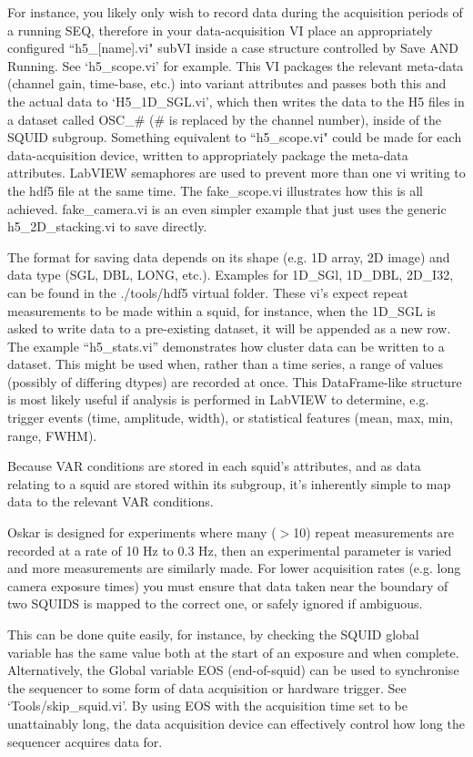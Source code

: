 \documentclass[10pt,a4paper]{article}
\newenvironment{warning}[1]{%
	\tcolorbox[beamer,%
	breakable,
	colback=white,colframe=DarkRed,%
	title=Warning:]}%
{\endtcolorbox}
\begin{document}
For instance, you likely only wish to record data during the acquisition periods of a running SEQ, therefore in your data-acquisition VI place an appropriately configured ``h5\_[name].vi" subVI inside a case structure controlled by Save AND Running.  See `h5\_scope.vi' for example.  This VI packages the relevant meta-data (channel gain, time-base, etc.) into variant attributes and passes both this and the actual data to `H5\_1D\_SGL.vi', which then writes the data to the H5 files in a dataset called OSC\_\# (\# is replaced by the channel number), inside of the SQUID subgroup.  Something equivalent to ``h5\_scope.vi" could be made for each data-acquisition device, written to appropriately package the meta-data attributes.  LabVIEW semaphores are used to prevent more than one vi writing to the hdf5 file at the same time.  The fake\_scope.vi illustrates how this is all achieved.  fake\_camera.vi is an even simpler example that just uses the generic h5\_2D\_stacking.vi to save directly.

The format for saving data depends on its shape (e.g. 1D array, 2D image) and data type (SGL, DBL, LONG, etc.).  Examples for 1D\_SGl, 1D\_DBL, 2D\_I32, can be found in the ./tools/hdf5 virtual folder.  These vi's expect repeat measurements to be made within a squid, for instance, when the 1D\_SGL is asked to write data to a pre-existing dataset, it will be appended as a new row.  The example ``h5\_stats.vi'' demonstrates how cluster data can be written to a dataset.  This might be used when, rather than a time series, a range of values (possibly of differing dtypes) are recorded at once.  This DataFrame-like structure is most likely useful if analysis is performed in LabVIEW to determine, e.g. trigger events (time, amplitude, width), or statistical features (mean, max, min, range, FWHM).

Because VAR conditions are stored in each squid's attributes, and as data relating to a squid are stored within its subgroup, it's inherently simple to map data to the relevant VAR conditions.

\begin{warning}{}
	Oskar is designed for experiments where many ($>$10) repeat measurements are recorded at a rate of 10 Hz to 0.3 Hz, then an experimental parameter is varied and more measurements are similarly made.  For lower acquisition rates (e.g. long camera exposure times) you must ensure that data taken near the boundary of two SQUIDS is mapped to the correct one, or safely ignored if ambiguous.  
	
	This can be done quite easily, for instance, by checking the SQUID global variable has the same value both at the start of an exposure and when complete.  Alternatively, the Global variable EOS (end-of-squid) can be used to synchronise the sequencer to some form of data acquisition or hardware trigger.  See `Tools/skip\_squid.vi'.  By using EOS with the acquisition time set to be unattainably long, the data acquisition device can effectively control how long the sequencer acquires data for.
\end{warning}
\end{document}
